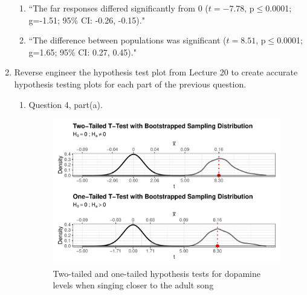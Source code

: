 \documentclass{article}\usepackage[]{graphicx}\usepackage[]{xcolor}
\begin{document}
\begin{enumerate}
\begin{enumerate}
  \item ``The far responses differed significantly from 0 ($t=-7.78$, p$\leq$0.0001; g=-1.51; 95\% CI: -0.26, -0.15)."
  
  \item ``The difference between populations was significant ($t=8.51$, p$\leq$0.0001; g=1.65; 95\% CI: 0.27, 0.45)."
  
\end{enumerate}
\item Reverse engineer the hypothesis test plot from Lecture 20 to create accurate
hypothesis testing plots for each part of the previous question.
\begin{enumerate}
  \item Question 4, part(a).
   \begin{figure}[H]
  \begin{center}
  \includegraphics[scale=.8]{close.hyp.plots.pdf}
  \caption{Two-tailed and one-tailed hypothesis tests for dopamine levels when singing closer to the adult song}
  \label{plot3}
  \end{center}
\end{figure} 

\newpage


\end{enumerate}
\end{enumerate}
\end{document}
